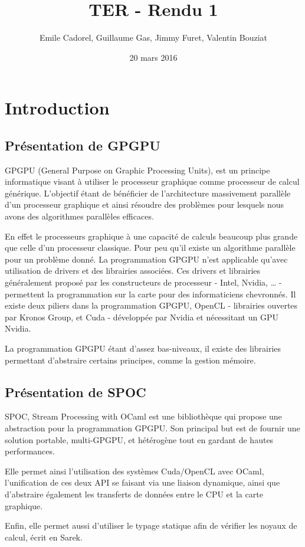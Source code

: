 \documentclass{report}
\title{TER - Rendu 1}
\author{Emile Cadorel, Guillaume Gas, Jimmy Furet, Valentin Bouziat}
\date{20 mars 2016}
\begin{document}
\maketitle

\chapter{Introduction}
\section{Présentation de GPGPU}
\cite{ref}
GPGPU (General Purpose on Graphic Processing Units), est un principe informatique visant à utiliser le processeur graphique comme processeur de calcul générique. L’objectif étant de bénéficier de l’architecture massivement parallèle d’un processeur graphique et ainsi résoudre des problèmes pour lesquels nous avons des algorithmes parallèles efficaces.

En effet le processeurs graphique à une capacité de calculs beaucoup plus grande que celle d’un processeur classique. Pour peu qu’il existe un algorithme parallèle pour un problème donné. La programmation GPGPU n’est applicable qu’avec utilisation de drivers et des librairies associées. Ces drivers et librairies généralement proposé par les constructeurs de processeur - Intel, Nvidia, … - permettent la programmation sur la carte pour des informaticiens chevronnés. Il existe deux piliers dans la programmation GPGPU, OpenCL - librairies ouvertes par Kronos Group, et Cuda - développée par Nvidia et nécessitant un GPU Nvidia.

La programmation GPGPU étant d’assez bas-niveaux, il existe des librairies permettant d’abstraire certains principes, comme la gestion mémoire. 

\section{Présentation de SPOC}
SPOC, Stream Processing with OCaml est une bibliothèque qui propose une abstraction pour la programmation GPGPU. Son principal but est de fournir une solution portable, multi-GPGPU, et hétérogène tout en gardant de hautes performances.

Elle permet ainsi l’utilisation des systèmes Cuda/OpenCL avec OCaml, l’unification de ces deux API se faisant via une liaison dynamique, ainsi que d’abstraire également les transferts de données entre le CPU et la carte graphique. 

Enfin, elle permet aussi d’utiliser le typage statique afin de vérifier les noyaux de calcul, écrit en Sarek.
\end{document}
